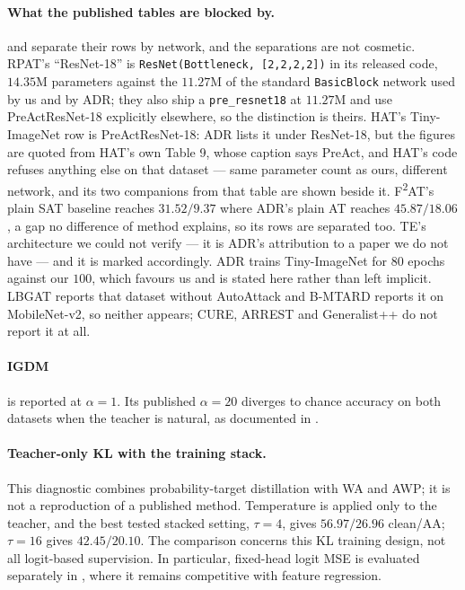 \paragraph{What the published tables are blocked by.}  and
 separate their rows by network, and the separations are not cosmetic. RPAT's
``ResNet-18'' is \texttt{ResNet(Bottleneck, [2,2,2,2])} in its released code, $14.35$M parameters
against the $11.27$M of the standard \texttt{BasicBlock} network used by us and by ADR; they also ship
a \texttt{pre\_resnet18} at $11.27$M and use PreActResNet-18 explicitly elsewhere, so the distinction
is theirs. HAT's Tiny-ImageNet row is PreActResNet-18: ADR lists it under ResNet-18, but the figures
are quoted from HAT's own Table 9, whose caption says PreAct, and HAT's code refuses anything else on
that dataset --- same parameter count as ours, different network, and its two companions from that
table are shown beside it. F\textsuperscript{2}AT's plain SAT baseline reaches $31.52 / 9.37$ where
ADR's plain AT reaches $45.87 / 18.06$, a gap no difference of method explains, so its rows are
separated too. TE's architecture we could not verify --- it is ADR's attribution to a paper we do not
have --- and it is marked accordingly. ADR trains Tiny-ImageNet for $80$ epochs against our $100$,
which favours us and is stated here rather than left implicit. LBGAT reports that dataset without
AutoAttack and B-MTARD reports it on MobileNet-v2, so neither appears; CURE, ARREST and Generalist++
do not report it at all.

\paragraph{IGDM} is reported at $\alpha = 1$. Its published $\alpha = 20$ diverges to chance accuracy
on both datasets when the teacher is natural, as documented in .

\paragraph{Teacher-only KL with the training stack.} This diagnostic combines probability-target
distillation with WA and AWP; it is not a reproduction of a published method. Temperature is applied
only to the teacher, and the best tested stacked setting, $\tau=4$, gives $56.97/26.96$ clean/AA;
$\tau=16$ gives $42.45/20.10$. The comparison concerns this KL training design, not all logit-based
supervision. In particular, fixed-head logit MSE is evaluated separately in
, where it remains competitive with feature regression.


